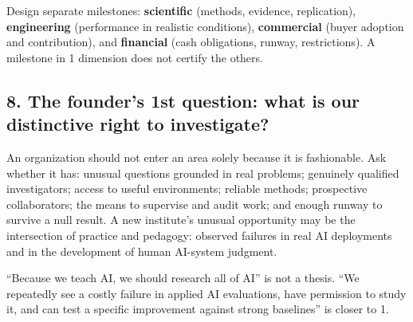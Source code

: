 Design separate milestones: \textbf{scientific} (methods, evidence, replication), \textbf{engineering} (performance in realistic conditions), \textbf{commercial} (buyer adoption and contribution), and \textbf{financial} (cash obligations, runway, restrictions). A milestone in 1 dimension does not certify the others.

\subsection{8. The founder's 1st question: what is our distinctive right to investigate?}

An organization should not enter an area solely because it is fashionable. Ask whether it has: unusual questions grounded in real problems; genuinely qualified investigators; access to useful environments; reliable methods; prospective collaborators; the means to supervise and audit work; and enough runway to survive a null result. A new institute's unusual opportunity may be the intersection of practice and pedagogy: observed failures in real AI deployments and in the development of human AI-system judgment.

``Because we teach AI, we should research all of AI'' is not a thesis. ``We repeatedly see a costly failure in applied AI evaluations, have permission to study it, and can test a specific improvement against strong baselines'' is closer to 1.
